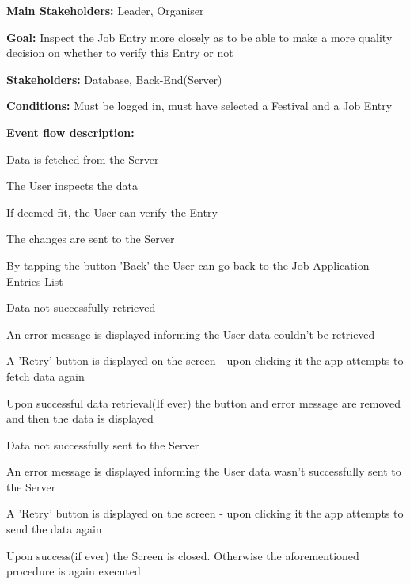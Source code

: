 			\noindent {}
			\begin{packed_item}
				\item \textbf{Main Stakeholders:} Leader, Organiser
				\item \textbf{Goal:} Inspect the Job Entry more closely as to be able to make a more quality decision on whether to verify this Entry or not
				\item \textbf{Stakeholders: } Database, Back-End(Server)
				\item \textbf{Conditions: } Must be logged in, must have selected a Festival and a Job Entry
				\item \textbf{Event flow description: }
				\begin{packed_enum}
					\item Data is fetched from the Server
					\item The User inspects the data
					\item If deemed fit, the User can verify the Entry
					\item The changes are sent to the Server
					\item By tapping the button 'Back' the User can go back to the Job Application Entries List
				\end{packed_enum}
				
				\begin{packed_item}
					\item[1.a] Data not successfully retrieved
					\item[] \begin{packed_enum}
						\item An error message is displayed informing the User data couldn't be retrieved
						\item A 'Retry' button is displayed on the screen - upon clicking it the app attempts to fetch data again
						\item Upon successful data retrieval(If ever) the button and error message are removed and then the data is displayed
					\end{packed_enum}
				
					\item[4.a] Data not successfully sent to the Server
					\item[] \begin{packed_enum}
						\item An error message is displayed informing the User data wasn't successfully sent to the Server
						\item A 'Retry' button is displayed on the screen - upon clicking it the app attempts to send the data again
						\item Upon success(if ever) the Screen is closed. Otherwise the aforementioned procedure is again executed
					\end{packed_enum}
				\end{packed_item}
			\end{packed_item}
			
